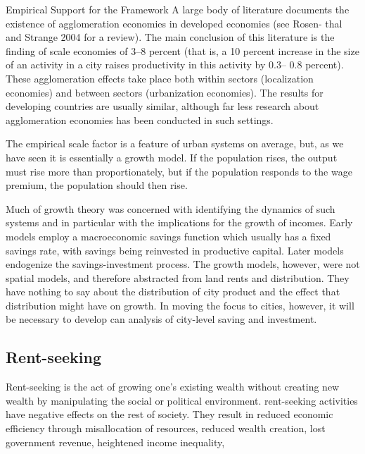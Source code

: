 Empirical Support for the Framework\cite{spenceUrbanizationGrowth2009}\cite{durantonAreCitiesEngines2009}\cite{durantonHumanCapitalExternalities2007}
A large body of literature documents the existence of agglomeration economies in developed economies (see Rosen- thal and Strange 2004 for a review). The main conclusion of this literature is the finding of scale economies of 3–8 percent (that is, a 10 percent increase in the size of an activity in a city raises productivity in this activity by 0.3– 0.8 percent). These agglomeration effects take place both within sectors (localization economies) and between sectors (urbanization economies). The results for developing countries are usually similar, although far less research about agglomeration economies has been conducted in such settings.

The empirical scale factor is a feature of urban systems on average, but, as we have seen it is essentially a growth model. If the population rises, the output must rise more than proportionately, but if the population responds to the wage premium, the population should then rise. 

Much of growth theory was concerned with identifying the dynamics of such systems and in particular with the implications for the growth of incomes. Early models employ a macroeconomic savings function which usually has a fixed savings rate, with savings being reinvested in productive capital. Later models endogenize the savings-investment process. The growth models, however, were not spatial models, and therefore abstracted from land rents and distribution. They have nothing to say about the distribution of city product and the effect that distribution might have on growth. In moving the focus to cities, however, it will be necessary to develop can analysis of city-level saving and investment. 

\subsection{Rent-seeking}
  Rent-seeking is the act of growing one's existing wealth without creating new wealth by manipulating the social or political environment. \Gls{rent-seeking} activities have negative effects on the rest of society. They result in reduced economic efficiency through misallocation of resources, reduced wealth creation, lost government revenue, heightened income inequality,


